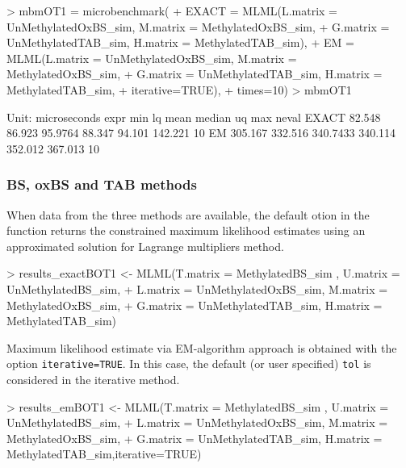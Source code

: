 \documentclass{article}
\begin{document}
\begin{Schunk}
\begin{Sinput}
>  mbmOT1 = microbenchmark(
+     EXACT = MLML(L.matrix = UnMethylatedOxBS_sim, M.matrix = MethylatedOxBS_sim,
+                  G.matrix = UnMethylatedTAB_sim, H.matrix = MethylatedTAB_sim),
+     EM =    MLML(L.matrix = UnMethylatedOxBS_sim, M.matrix = MethylatedOxBS_sim,
+                  G.matrix = UnMethylatedTAB_sim, H.matrix = MethylatedTAB_sim,
+                  iterative=TRUE),
+     times=10)
>  mbmOT1
\end{Sinput}
\begin{Soutput}
Unit: microseconds
  expr     min      lq     mean  median      uq     max neval
 EXACT  82.548  86.923  95.9764  88.347  94.101 142.221    10
    EM 305.167 332.516 340.7433 340.114 352.012 367.013    10
\end{Soutput}
\end{Schunk}



\subsubsection{BS, oxBS and TAB methods}

When data from the three methods are available, the default otion in the  function returns the constrained maximum likelihood estimates using an approximated solution for Lagrange multipliers method.


\begin{Schunk}
\begin{Sinput}
> results_exactBOT1 <- MLML(T.matrix = MethylatedBS_sim , U.matrix = UnMethylatedBS_sim,
+ L.matrix = UnMethylatedOxBS_sim, M.matrix = MethylatedOxBS_sim,
+ G.matrix = UnMethylatedTAB_sim, H.matrix = MethylatedTAB_sim)
\end{Sinput}
\end{Schunk}

Maximum likelihood estimate via EM-algorithm approach \cite{Qu:MLML} is obtained with the option \verb|iterative=TRUE|. In this case, the default (or user specified) \verb|tol| is considered in the iterative method.

\begin{Schunk}
\begin{Sinput}
>  results_emBOT1 <- MLML(T.matrix = MethylatedBS_sim , U.matrix = UnMethylatedBS_sim,
+  L.matrix = UnMethylatedOxBS_sim, M.matrix = MethylatedOxBS_sim,
+  G.matrix = UnMethylatedTAB_sim, H.matrix = MethylatedTAB_sim,iterative=TRUE)
\end{Sinput}
\end{Schunk}
\end{document}
